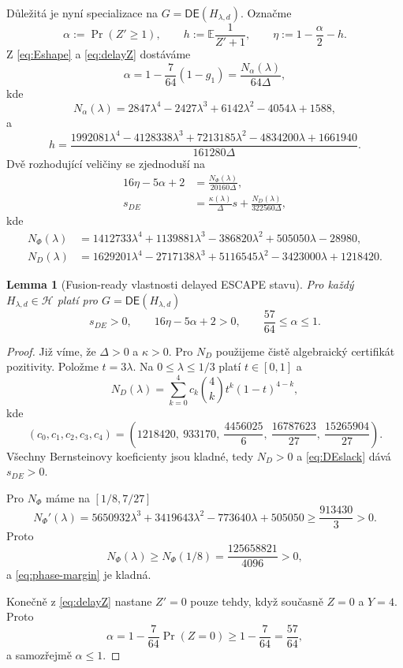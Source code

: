 \documentclass[11pt,a4paper]{article}
\newtheorem{lemma}[theorem]{Lemma}
\theoremstyle{remark}
\newcommand{\HH}{\mathcal H}
\newcommand{\Eop}{\mathsf E}
\newcommand{\Dop}{\mathsf D}
\begin{document}
Důležitá je nyní specializace na $G=\Dop\Eop(H_{\lambda,d})$.
Označme
\[
\alpha:=\Pr(Z'\ge1),
\qquad
h:=\mathbb E\frac1{Z'+1},
\qquad
\eta:=1-\frac\alpha2-h.
\]
Z \eqref{eq:Eshape} a \eqref{eq:delayZ} dostáváme
\begin{equation}\label{eq:alphaDE}
\alpha
=1-\frac7{64}(1-g_1)
=\frac{N_\alpha(\lambda)}{64\Delta},
\end{equation}
kde
\[
N_\alpha(\lambda)
=2847\lambda^4-2427\lambda^3+6142\lambda^2-4054\lambda+1588,
\]
a
\begin{equation}\label{eq:hDE}
h
=\frac{1992081\lambda^4-4128338\lambda^3+7213185\lambda^2
-4834200\lambda+1661940}{161280\Delta}.
\end{equation}
Dvě rozhodující veličiny se zjednoduší na
\begin{align}
16\eta-5\alpha+2
&=\frac{N_\Phi(\lambda)}{20160\Delta},\label{eq:phase-margin}\\
s_{DE}
&=\frac{\kappa(\lambda)}{\Delta}s
+\frac{N_D(\lambda)}{322560\Delta},\label{eq:DEslack}
\end{align}
kde
\begin{align*}
N_\Phi(\lambda)
&=1412733\lambda^4+1139881\lambda^3-386820\lambda^2
+505050\lambda-28980,\\
N_D(\lambda)
&=1629201\lambda^4-2717138\lambda^3+5116545\lambda^2
-3423000\lambda+1218420.
\end{align*}

\begin{lemma}[Fusion-ready vlastnosti delayed ESCAPE stavu]\label{lem:DEsafe}
Pro každý $H_{\lambda,d}\in\HH$ platí pro
$G=\Dop\Eop(H_{\lambda,d})$
\begin{equation}\label{eq:DEproperties}
\boxed{
s_{DE}>0,
\qquad
16\eta-5\alpha+2>0,
\qquad
\frac{57}{64}\le\alpha\le1.}
\end{equation}
\end{lemma}

\begin{proof}
Již víme, že $\Delta>0$ a $\kappa>0$. Pro $N_D$ použijeme čistě
algebraický certifikát pozitivity. Položme $t=3\lambda$. Na $0\le\lambda\le1/3$
platí $t\in[0,1]$ a
\[
N_D(\lambda)
=\sum_{k=0}^4 c_k\binom4k t^k(1-t)^{4-k},
\]
kde
\[
(c_0,c_1,c_2,c_3,c_4)
=\left(
1218420,\ 933170,\ \frac{4456025}{6},\
\frac{16787623}{27},\ \frac{15265904}{27}
\right).
\]
Všechny Bernsteinovy koeficienty jsou kladné, tedy $N_D>0$ a
\eqref{eq:DEslack} dává $s_{DE}>0$.

Pro $N_\Phi$ máme na $[1/8,7/27]$
\[
N_\Phi'(\lambda)
=5650932\lambda^3+3419643\lambda^2-773640\lambda+505050
\ge \frac{913430}{3}>0.
\]
Proto
\[
N_\Phi(\lambda)
\ge N_\Phi(1/8)
=\frac{125658821}{4096}>0,
\]
a \eqref{eq:phase-margin} je kladná.

Konečně z \eqref{eq:delayZ} nastane $Z'=0$ pouze tehdy, když současně
$Z=0$ a $Y=4$. Proto
\[
\alpha=1-\frac7{64}\Pr(Z=0)
\ge1-\frac7{64}=\frac{57}{64},
\]
a samozřejmě $\alpha\le1$.
\end{proof}
\end{document}
